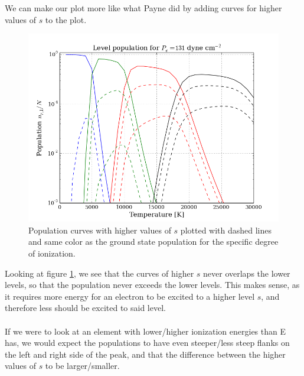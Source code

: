 \documentclass{article}
\begin{document}
We can make our plot more like what Payne did by adding curves for higher values of $s$ to the plot.
\begin{figure}[H]
  \centering
  \includegraphics[scale=0.5]{schadeenium_pop_higher.png}
  \caption{Population curves with higher values of $s$ plotted with dashed lines and same color as the ground state population for the specific degree of ionization.}
  \label{fig:payne_lower}
\end{figure}
Looking at figure \ref{fig:payne_lower}, we see that the curves of higher $s$ never overlaps the lower levels, so that the population never exceeds the lower levels. This makes sense, as it requires more energy for an electron to be excited to a higher level $s$, and therefore less should be excited to said level.\\\\
If we were to look at an element with lower/higher ionization energies than E has, we would expect the populations to have even steeper/less steep flanks on the left and right side of the peak, and that the difference between the higher values of $s$ to be larger/smaller.
\end{document}

